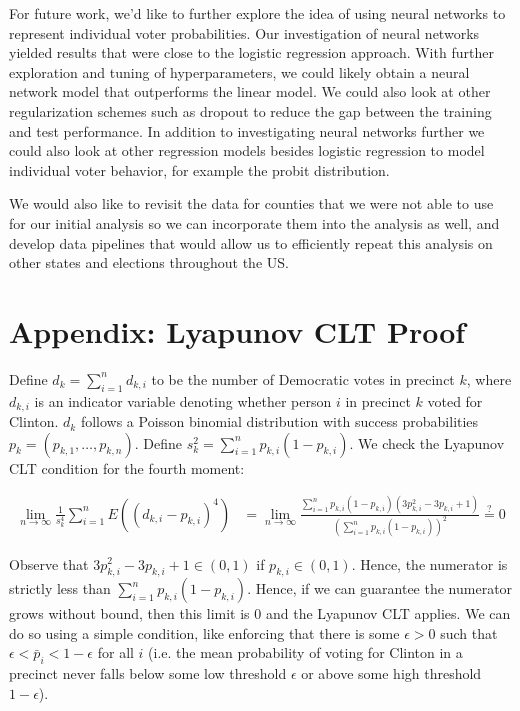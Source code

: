 \documentclass[10pt, letterpaper]{article}
\begin{document}
\begin{multicols}{2}
For future work, we'd like to further explore the idea of using neural networks to represent individual voter probabilities. Our investigation of neural networks yielded results that were close to the logistic regression approach. With further exploration and tuning of hyperparameters, we could likely obtain a neural network model that outperforms the linear model. We could also look at other regularization schemes such as dropout to reduce the gap between the training and test performance. In addition to investigating neural networks further we could also look at other regression models besides logistic regression to model individual voter behavior, for example the probit distribution.

We would also like to revisit the data for counties that we were not able to use for our initial analysis so we can incorporate them into the analysis as well, and develop data pipelines that would allow us to efficiently repeat this analysis on other states and elections throughout the US. 
\end{multicols}

\section*{Appendix: Lyapunov CLT Proof}

Define $d_k = \sum_{i = 1}^n d_{k, i}$ to be the number of Democratic votes in precinct $k$, where $d_{k, i}$ is an indicator variable denoting whether person $i$ in precinct $k$ voted for Clinton. $d_k$ follows a Poisson binomial distribution with success probabilities $p_k = (p_{k, 1}, \dots, p_{k, n})$. Define $s_{k}^2 = \sum_{i = 1}^{n} p_{k, i} (1-p_{k, i})$. 
We check the Lyapunov CLT \cite{billingsley1995probability} condition for the fourth moment: 

\begin{align*}
\lim_{n \to \infty} \frac{1}{s_k^4} \sum_{i = 1}^n E \left( (d_{k, i} - p_{k, i})^4 \right) &= \lim_{n \to \infty} \frac{\sum_{i = 1}^n p_{k, i}(1-p_{k, i}) \left( 3p_{k, i}^2 - 3p_{k, i} + 1 \right)}{\left(\sum_{i = 1}^n p_{k, i} \left( 1- p_{k, i} \right) \right)^2} \stackrel{?} = 0 
\end{align*}

Observe that $3p_{k, i}^2 - 3p_{k, i} + 1 \in (0, 1)$ if $p_{k, i} \in (0, 1)$. Hence, the numerator is strictly less than $\sum_{i = 1}^n p_{k, i} (1 - p_{k, i})$. Hence, if we can guarantee the numerator grows without bound, then this limit is 0 and the Lyapunov CLT applies. We can do so using a simple condition, like enforcing that there is some $\epsilon > 0$ such that $\epsilon < \bar p_i < 1- \epsilon$ for all $i$ (i.e. the mean probability of voting for Clinton in a precinct never falls below some low threshold $\epsilon$ or above some high threshold $1-\epsilon$). 
\end{document}
